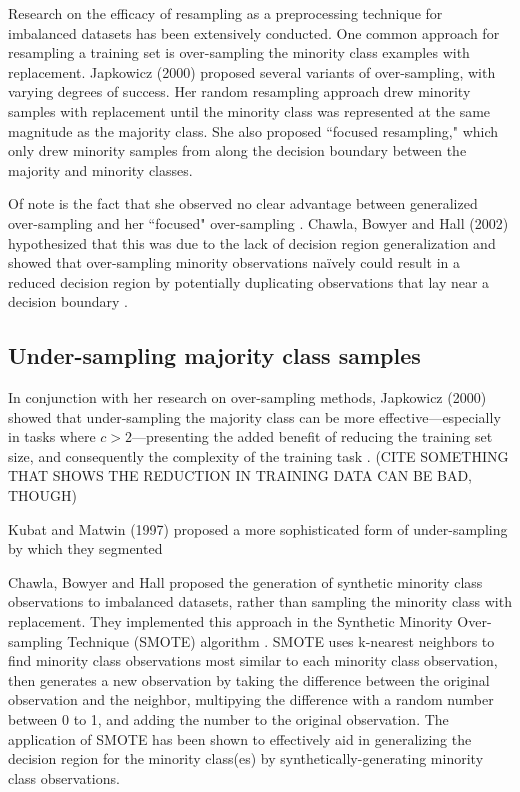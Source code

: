 \documentclass[twoside,11pt]{article}
\begin{document}
Research on the efficacy of resampling as a preprocessing technique for imbalanced datasets has been extensively conducted. One common approach for resampling a training set is over-sampling the minority class examples with replacement. Japkowicz (2000) proposed several variants of over-sampling, with varying degrees of success. Her random resampling approach drew minority samples with replacement until the minority class was represented at the same magnitude as the majority class. She also proposed ``focused resampling," which only drew minority samples from along the decision boundary between the majority and minority classes. 

Of note is the fact that she observed no clear advantage between generalized over-sampling and her ``focused" over-sampling \citep{japkowicz2000learning}. Chawla, Bowyer and Hall (2002) hypothesized that this was due to the lack of decision region generalization and showed that over-sampling minority observations na\"ively could result in a reduced decision region by potentially duplicating observations that lay near a decision boundary \citep{chawla2002smote}.


\subsection{Under-sampling majority class samples}

In conjunction with her research on over-sampling methods, Japkowicz (2000) showed that under-sampling the majority class can be more effective---especially in tasks where $c > 2$---presenting the added benefit of reducing the training set size, and consequently the complexity of the training task \citep{japkowicz2000learning}. (CITE SOMETHING THAT SHOWS THE REDUCTION IN TRAINING DATA CAN BE BAD, THOUGH)

Kubat and Matwin (1997) proposed a more sophisticated form of under-sampling by which they segmented \citep{kubat1997addressing}

Chawla, Bowyer and Hall proposed the generation of synthetic minority class observations to imbalanced datasets, rather than sampling the minority class with replacement.  They implemented this approach in the Synthetic Minority Over-sampling Technique (SMOTE) algorithm \citep{chawla2002smote}. SMOTE uses k-nearest neighbors to find minority class observations most similar to each minority class observation, then generates a new observation by taking the difference between the original observation and the neighbor, multipying the difference with a random number between 0 to 1, and adding the number to the original observation. The application of SMOTE has been shown to effectively aid in generalizing the decision region for the minority class(es) by synthetically-generating minority class observations.  
\end{document}
